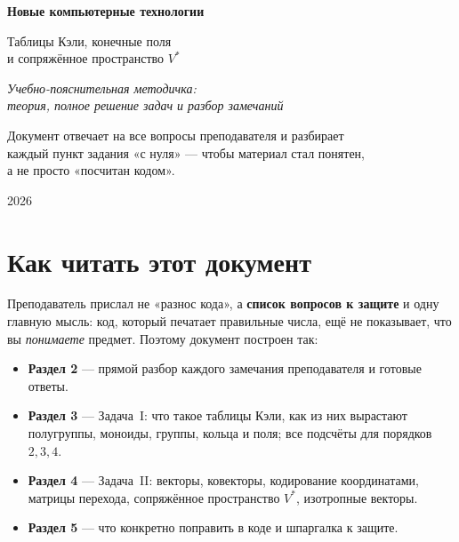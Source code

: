 \documentclass[11pt]{article}
\begin{document}
\begin{titlepage}
\centering
\vspace*{2.2cm}
{\Huge\bfseries\color{accent} Новые компьютерные технологии\par}
\vspace{0.8cm}
{\LARGE Таблицы Кэли, конечные поля\\[4pt] и сопряжённое пространство $V^{*}$\par}
\vspace{1.4cm}
{\large\itshape Учебно-пояснительная методичка:\\
теория, полное решение задач и разбор замечаний\par}
\vspace{2.4cm}
\begin{tcolorbox}[colback=soft, colframe=accent, width=0.8\textwidth, arc=3pt]
\centering
Документ отвечает на все вопросы преподавателя и разбирает\\
каждый пункт задания «с нуля» — чтобы материал стал понятен,\\
а не просто «посчитан кодом».
\end{tcolorbox}
\vfill
{\large 2026\par}
\end{titlepage}

\tableofcontents
\thispagestyle{empty}
\clearpage

\section{Как читать этот документ}

Преподаватель прислал не «разнос кода», а \textbf{список вопросов к защите} и одну
главную мысль: код, который печатает правильные числа, ещё не показывает, что вы
\emph{понимаете} предмет. Поэтому документ построен так:

\begin{itemize}[leftmargin=1.4em]
  \item \textbf{Раздел 2} — прямой разбор каждого замечания преподавателя и готовые ответы.
  \item \textbf{Раздел 3} — Задача~I: что такое таблицы Кэли, как из них вырастают
        полугруппы, моноиды, группы, кольца и поля; все подсчёты для порядков $2,3,4$.
  \item \textbf{Раздел 4} — Задача~II: векторы, ковекторы, кодирование координатами,
        матрицы перехода, сопряжённое пространство $V^{*}$, изотропные векторы.
  \item \textbf{Раздел 5} — что конкретно поправить в коде и шпаргалка к защите.
\end{itemize}
\end{document}

